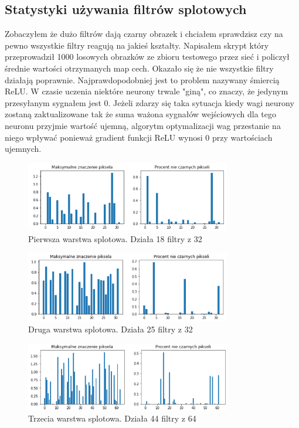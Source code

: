 \documentclass{article}
\begin{document}
\subsection{Statystyki używania filtrów splotowych}
Zobaczyłem że dużo filtrów dają czarny obrazek i chciałem sprawdzisz czy na pewno wszystkie filtry reagują na jakieś kształty. Napisałem skrypt który przeprowadził 1000 losowych obrazków ze zbioru testowego przez sieć i policzył średnie wartości otrzymanych map cech. Okazało się że nie wszystkie filtry działają poprawnie. Najprawdopodobniej jest to problem nazywany śmiercią ReLU. W czasie uczenia niektóre neurony trwale "giną", co znaczy, że jedynym przesyłanym sygnałem jest 0. Jeżeli zdarzy się taka sytuacja kiedy wagi neurony zostaną zaktualizowane tak że suma ważona sygnałów wejściowych dla tego neuronu przyjmie wartość ujemną, algorytm optymalizacji wag przestanie  na niego  wpływać ponieważ gradient funkcji ReLU wynosi 0 przy wartościach ujemnych. \cite{geron}

\begin{figure}[H]
	\centering
	\includegraphics[width=0.8\textwidth,keepaspectratio=true]{statystyka_warstwy_1}
	\caption{Pierwsza warstwa splotowa. Działa 18 filtry z 32}
	\label{statystyka_warstwy_1}
\end{figure}

\begin{figure}[H]
	\centering
	\includegraphics[width=0.8\textwidth,keepaspectratio=true]{statystyka_warstwy_2}
	\caption{Druga warstwa splotowa. Działa 25 filtry z 32}
	\label{statystyka_warstwy_2}
\end{figure}

\begin{figure}[H]
	\centering
	\includegraphics[width=0.8\textwidth,keepaspectratio=true]{statystyka_warstwy_3}
	\caption{Trzecia warstwa splotowa. Działa 44 filtry z 64}
	\label{statystyka_warstwy_3}
\end{figure}
\end{document}
